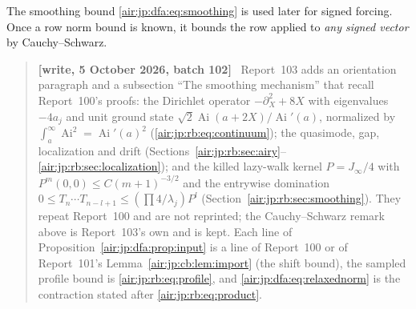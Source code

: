\documentclass[11pt,letterpaper]{article}
\numberwithin{equation}{section}
\theoremstyle{remark}
\newcommand{\Ai}{\operatorname{Ai}}
\newenvironment{writenotejp}{\par\smallskip\begin{quote}\small\textbf{[write, 5 October 2026, batch 102]}\ }{\end{quote}\smallskip}
\begin{document}
The smoothing bound \eqref{air:jp:dfa:eq:smoothing} is used later for signed forcing. Once a row norm bound is known, it bounds the row applied to \emph{any signed vector} by Cauchy--Schwarz.
\begin{writenotejp}
Report~103 adds an orientation paragraph and a subsection ``The smoothing mechanism'' that recall Report~100's proofs: the Dirichlet operator $-\partial_X^2+8X$ with eigenvalues $-4a_j$ and unit ground state $\sqrt2\Ai(a+2X)/\Ai'(a)$, normalized by $\int_a^\infty\Ai^2=\Ai'(a)^2$ (\eqref{air:jp:rb:eq:continuum}); the quasimode, gap, localization and drift (Sections~\ref{air:jp:rb:sec:airy}--\ref{air:jp:rb:sec:localization}); and the killed lazy-walk kernel $P=J_\infty/4$ with $P^m(0,0)\le C(m+1)^{-3/2}$ and the entrywise domination $0\le T_n\cdots T_{n-l+1}\le(\prod4/\lambda_j)P^l$ (Section~\ref{air:jp:rb:sec:smoothing}). They repeat Report~100 and are not reprinted; the Cauchy--Schwarz remark above is Report~103's own and is kept. Each line of Proposition~\ref{air:jp:dfa:prop:input} is a line of Report~100 or of Report~101's Lemma~\ref{air:jp:cb:lem:import} (the shift bound), the sampled profile bound is \eqref{air:jp:rb:eq:profile}, and \eqref{air:jp:dfa:eq:relaxednorm} is the contraction stated after \eqref{air:jp:rb:eq:product}.
\end{writenotejp}
\end{document}
